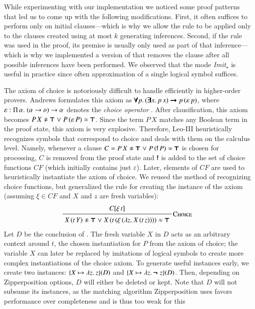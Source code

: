 While experimenting with our implementation we noticed some proof patterns that
led us to come up with the following modifications. First, it often suffices to
perform  only on initial clauses---which is why we allow the rule to
be applied only to the clauses created using at most $k$ generating inferences.
Second, if the rule was used in the proof, its premise is usually only used as
part of that inference---which is why we implemented a version of 
that removes the clause after all possible  inferences have been
performed. We observed that the mode \emph{Imit}$_\star$ is useful in practice
since often approximation of a single logical symbol suffices.

The axiom of choice is notoriously difficult to handle efficiently in higher-order provers. Andrews formulates
this axiom as $\pmb{\forall} p.\, (\pmb{\exists}
x.\, p \, x) \pmb{\rightarrow} p \, (\varepsilon \, p)$, where $\varepsilon :
\Pi\,\alpha.\;(\alpha \rightarrow o) \rightarrow \alpha$ denotes the \emph{choice
operator} \cite{pa-01-classical-ty-thy}. After clausification, this axiom becomes $P \, X \noteq \itrue \llor P
\, (\varepsilon \, P) \eq \itrue$. Since the term $P \, X$ matches any Boolean
term in the proof state, this axiom is very explosive. Therefore, Leo-III
\cite{sb-21-leo3} heuristically recognizes symbols that correspond to choice and deals with
them on the calculus level. Namely, whenever a clause $C = P \, X \noteq \itrue \llor P \, (\cst{f} \,
P) \eq \itrue$ is chosen for processing, $C$ is removed from the proof state and $\mathsf{f}$ is
added to the set of choice functions $\mathit{CF}$ (which initially contains just
$\varepsilon$). Later, elements of $\mathit{CF}$ are used to heuristically
instantiate the axiom of choice. We reused the method of recognizing choice
functions, but generalized the rule for creating the instance of
the axiom (assuming $\xi \in \mathit{CF}$ and $X$ and $z$ are fresh variables):
%
$$\namedinference{Choice}
               {C[\xi \, t]}
               { X \, (t \, Y) \noteq \itrue \llor X \, (t \, (\xi \, (\lam{z}{X \, (t \, z)})) ) \eq \itrue }$$
%
Let $D$ be the conclusion of . The fresh variable $X$ in $D$ acts as
an arbitrary context around $t$, the chosen instantiation for $P$ from the axiom of choice;
the variable $X$ can later be replaced by imitations of logical symbols to create more
complex instantiations of the choice axiom. To generate useful instances early, we create two instances: $\{X
\mapsto \lambda z.\> z\}(D)$ and $\{X \mapsto \lambda z.\> \pmb{\neg\,}\, z\}(D)$. Then, depending on
Zipperposition options, $D$ will either be deleted or kept. Note that $D$
will not subsume its instances, as the matching algorithm Zipperposition uses favors performance over completeness and is
thus too weak for this \cite[Sect.~6]{bbtvw-21-sup-lam}

